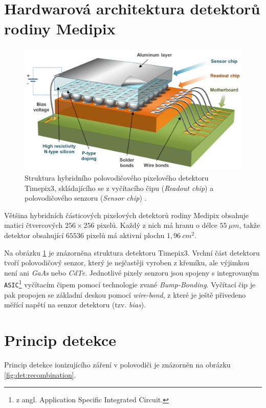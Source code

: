 \section{Hardwarová architektura detektorů rodiny Medipix}
\begin{figure}[th]
	\begin{center}
		\includegraphics[width=12cm]{figures/det_chip.png}
		\caption{Struktura hybridního polovodičového pixelového detektoru Timepix3, skládajícího se z vyčítacího čipu (\textit{Readout chip}) a polovodičového senzoru (\textit{Sensor chip}) \cite{PlatkevicDisertace}.}
		\label{fig:det:chip}
	\end{center}
\end{figure}
Většina hybridních částicových pixelových detektorů rodiny Medipix obsahuje matici čtvercových $256\times256$ pixelů. Každý z nich má hranu o délce $55~\mu m$, takže detektor obsahující $65536$ pixelů má aktivní plochu $1,96~cm^2$. 

Na obrázku \ref{fig:det:chip} je znázorněna struktura detektoru Timepix3. Vrchní část detektoru tvoří polovodičový senzor, který je nejčastěji vyroben z křemíku, ale výjimkou není ani \textit{GaAs} nebo \textit{CdTe}. Jednotlivé pixely senzoru jsou spojeny s integrovaným \texttt{ASIC}\footnote{z angl. Application Specific Integrated Circuit.} vyčítacím čipem pomocí technologie zvané \textit{Bump-Bonding}. Vyčítací čip je pak propojen se základní deskou pomocí \textit{wire-bond}, z které je ještě přivedeno měřící napětí na senzor detektoru (tzv. \textit{bias}).


\section{Princip detekce}\label{chap:detectors:princip}
Princip detekce ionizujícího záření v polovodiči je znázorněn na obrázku \ref{fig:det:recombination}.

